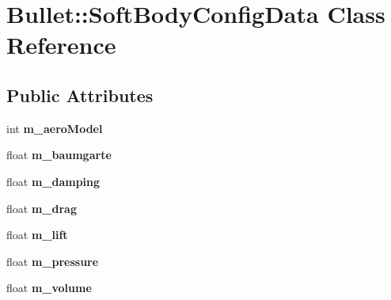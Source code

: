 \hypertarget{class_bullet_1_1_soft_body_config_data}{\section{Bullet\+:\+:Soft\+Body\+Config\+Data Class Reference}
\label{class_bullet_1_1_soft_body_config_data}
}
\subsection*{Public Attributes}
\begin{DoxyCompactItemize}
\item 
\hypertarget{class_bullet_1_1_soft_body_config_data_a58716f8153c67b22081c976a2ebf4ad9}{int {\bfseries m\+\_\+aero\+Model}}\label{class_bullet_1_1_soft_body_config_data_a58716f8153c67b22081c976a2ebf4ad9}

\item 
\hypertarget{class_bullet_1_1_soft_body_config_data_a2bd5ce76e8ac3d72a17bd874419566af}{float {\bfseries m\+\_\+baumgarte}}\label{class_bullet_1_1_soft_body_config_data_a2bd5ce76e8ac3d72a17bd874419566af}

\item 
\hypertarget{class_bullet_1_1_soft_body_config_data_ac3695ed062fd2a6147ca6a173b455d72}{float {\bfseries m\+\_\+damping}}\label{class_bullet_1_1_soft_body_config_data_ac3695ed062fd2a6147ca6a173b455d72}

\item 
\hypertarget{class_bullet_1_1_soft_body_config_data_ad2cc48adcf3b7398661a78e5862fb996}{float {\bfseries m\+\_\+drag}}\label{class_bullet_1_1_soft_body_config_data_ad2cc48adcf3b7398661a78e5862fb996}

\item 
\hypertarget{class_bullet_1_1_soft_body_config_data_ab99628c0dc774a5afcc13481574fe3cb}{float {\bfseries m\+\_\+lift}}\label{class_bullet_1_1_soft_body_config_data_ab99628c0dc774a5afcc13481574fe3cb}

\item 
\hypertarget{class_bullet_1_1_soft_body_config_data_adb18f30327328bd74d61aeb0892be054}{float {\bfseries m\+\_\+pressure}}\label{class_bullet_1_1_soft_body_config_data_adb18f30327328bd74d61aeb0892be054}

\item 
\hypertarget{class_bullet_1_1_soft_body_config_data_a1f7741135cfb2c782d19c6afd30dabd4}{float {\bfseries m\+\_\+volume}}\label{class_bullet_1_1_soft_body_config_data_a1f7741135cfb2c782d19c6afd30dabd4}


\end{DoxyCompactItemize}
